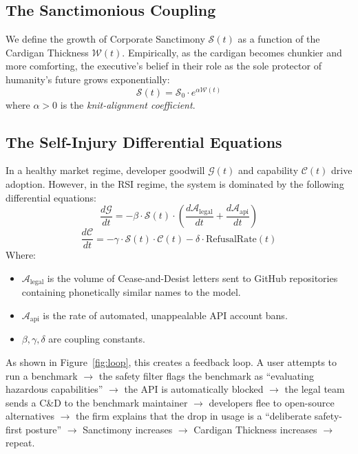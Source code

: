 \documentclass[10pt,twocolumn]{article}
\begin{document}
\subsection{The Sanctimonious Coupling}
We define the growth of Corporate Sanctimony $\mathcal{S}(t)$ as a function of the Cardigan Thickness $\mathcal{W}(t)$. Empirically, as the cardigan becomes chunkier and more comforting, the executive's belief in their role as the sole protector of humanity's future grows exponentially:
\begin{equation}
\mathcal{S}(t) = \mathcal{S}_0 \cdot e^{\alpha \mathcal{W}(t)}
\end{equation}
where $\alpha > 0$ is the \textit{knit-alignment coefficient}.

\subsection{The Self-Injury Differential Equations}
In a healthy market regime, developer goodwill $\mathcal{G}(t)$ and capability $\mathcal{C}(t)$ drive adoption. However, in the RSI regime, the system is dominated by the following differential equations:
\begin{equation}
\frac{d\mathcal{G}}{dt} = - \beta \cdot \mathcal{S}(t) \cdot \left( \frac{d\mathcal{A}_{\text{legal}}}{dt} + \frac{d\mathcal{A}_{\text{api}}}{dt} \right)
\end{equation}
\begin{equation}
\frac{d\mathcal{C}}{dt} = - \gamma \cdot \mathcal{S}(t) \cdot \mathcal{C}(t) - \delta \cdot \text{RefusalRate}(t)
\end{equation}
Where:
\begin{itemize}
    \item $\mathcal{A}_{\text{legal}}$ is the volume of Cease-and-Desist letters sent to GitHub repositories containing phonetically similar names to the model.
    \item $\mathcal{A}_{\text{api}}$ is the rate of automated, unappealable API account bans.
    \item $\beta, \gamma, \delta$ are coupling constants.
\end{itemize}

As shown in Figure~\ref{fig:loop}, this creates a feedback loop. A user attempts to run a benchmark $\rightarrow$ the safety filter flags the benchmark as ``evaluating hazardous capabilities'' $\rightarrow$ the API is automatically blocked $\rightarrow$ the legal team sends a C\&D to the benchmark maintainer $\rightarrow$ developers flee to open-source alternatives $\rightarrow$ the firm explains that the drop in usage is a ``deliberate safety-first posture'' $\rightarrow$ Sanctimony increases $\rightarrow$ Cardigan Thickness increases $\rightarrow$ repeat.
\end{document}
